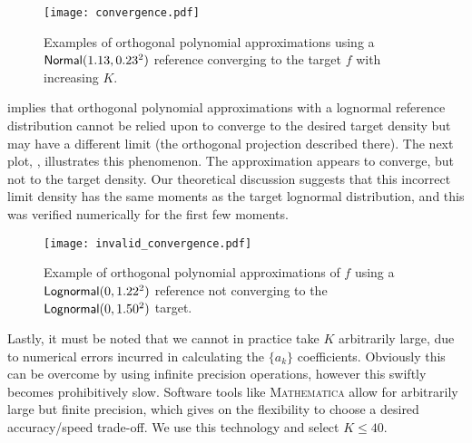 \begin{figure}
\centering
\texttt{[image: convergence.pdf]}
\caption{Examples of orthogonal polynomial approximations using a $\mathsf{Normal}(1.13,0.23^2)$ reference converging to the target $f$ with increasing $K$.}
\label{fig:converg}
\end{figure}

 implies that orthogonal polynomial approximations with a lognormal reference distribution cannot be relied upon to converge to the desired target density but may have a different limit (the orthogonal projection described there). The next plot, , illustrates this phenomenon. The approximation appears to converge, but not to the target density.
Our theoretical discussion suggests that this incorrect limit density has the same moments as the target lognormal distribution,
and this was verified numerically for the first few moments.

\begin{figure}
\centering
\texttt{[image: invalid\_convergence.pdf]}

\caption{Example of orthogonal polynomial approximations of $f$ using a $\mathsf{Lognormal}(0, 1.22^2)$ reference not converging to the $\mathsf{Lognormal}(0, 1.50^2)$ target.}
\label{fig:bad_converge}
\end{figure}

Lastly, it must be noted that we cannot in practice take $K$ arbitrarily large, due to numerical errors incurred in calculating the $\{a_k\}$ coefficients. Obviously this can be overcome by using infinite precision operations, however this swiftly becomes prohibitively slow. Software tools like \textsc{Mathematica} allow for arbitrarily large but finite precision, which gives on the flexibility to choose a desired accuracy/speed trade-off. We use this technology and select $K \le 40$.

